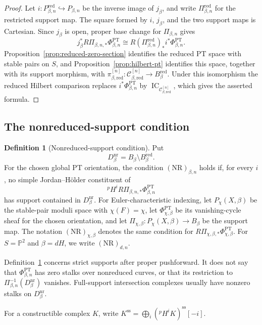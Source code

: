 \documentclass[11pt,reqno]{amsart}
\theoremstyle{definition}
\newtheorem{definition}[theorem]{Definition}
\newcommand{\Pp}{\mathbb P}
\newcommand{\IC}{\operatorname{IC}}
\newcommand{\PT}{\operatorname{PT}}
\newcommand{\red}{\mathrm{red}}
\newcommand{\nr}{\mathrm{nr}}
\begin{document}
\begin{proof}
Let $i:P_{\beta,n}^{\red}\hookrightarrow P_{\beta,n}$ be the inverse image
of $j_\beta$, and write $\Pi_{\beta,n}^{\red}$ for the restricted support
map.  The square formed by $i$, $j_\beta$, and the two support maps is
Cartesian.  Since $j_\beta$ is open, proper base change for
$\Pi_{\beta,n}$ gives
\[
 j_\beta^*R\Pi_{\beta,n,*}\Phi_{\beta,n}^{\PT}
 \cong
 R(\Pi_{\beta,n}^{\red})_*i^*\Phi_{\beta,n}^{\PT}.
\]
Proposition~\ref{prop:reduced-zero-section} identifies the reduced PT space
with stable pairs on $S$, and Proposition~\ref{prop:hilbert-pt} identifies
this space, together with its support morphism, with
$\pi_{\beta,\red}^{[n]}:\mathcal C_{\beta,\red}^{[n]}\to
B_\beta^{\red}$.  Under this isomorphism the reduced Hilbert comparison replaces
$i^*\Phi_{\beta,n}^{\PT}$ by
$\IC_{\mathcal C_{\beta,\red}^{[n]}}$, which gives the asserted formula.
\end{proof}

\subsection{The nonreduced-support condition}

\begin{definition}[Nonreduced-support condition]
\label{def:nonreduced-support}
Put
\[
 D_\beta^{\nr}=B_\beta\setminus B_\beta^{\red}.
\]
For the chosen global PT orientation, the condition
$(\mathrm{NR})_{\beta,n}$ holds if, for every $i$, no simple
Jordan--H\"older constituent of
\[
 {}^pH^iR\Pi_{\beta,n,*}\Phi_{\beta,n}^{\PT}
\]
has support contained in $D_\beta^{\nr}$.  For Euler-characteristic
indexing, let $P_\chi(X,\beta)$ be the stable-pair moduli space with
$\chi(F)=\chi$, let $\Phi_{\chi,\beta}^{\PT}$ be its vanishing-cycle sheaf
for the chosen orientation, and let
$\Pi_{\chi,\beta}:P_\chi(X,\beta)\to B_\beta$ be the support map.  The
notation $(\mathrm{NR})_{\chi,\beta}$ denotes the same condition for
$R\Pi_{\chi,\beta,*}\Phi_{\chi,\beta}^{\PT}$.  For
$S=\Pp^2$ and $\beta=dH$, we write $(\mathrm{NR})_{d,n}$.
\end{definition}

Definition~\ref{def:nonreduced-support} concerns strict supports after proper
pushforward.  It does not say that $\Phi_{\beta,n}^{\PT}$ has zero stalks
over nonreduced curves, or that its restriction to
$\Pi_{\beta,n}^{-1}(D_\beta^{\nr})$ vanishes.  Full-support intersection
complexes usually have nonzero stalks on $D_\beta^{\nr}$.

For a constructible complex $K$, write
$K^{\mathrm{ss}}=\bigoplus_i({}^pH^iK)^{\mathrm{ss}}[-i]$.
\end{document}
